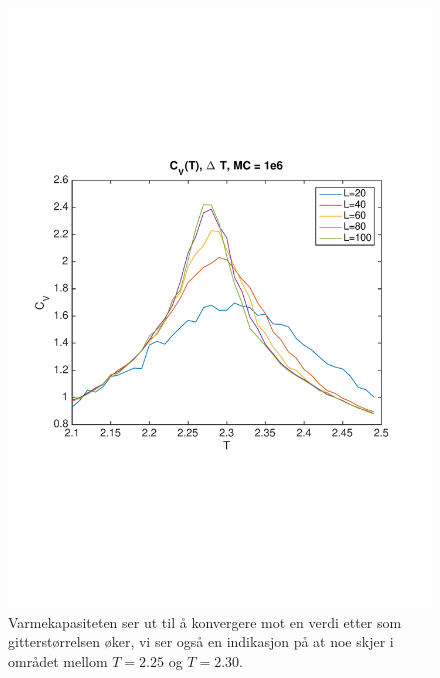 \documentclass[norsk, 10pt]{article}
\begin{document}
\begin{figure}[H]
	\centering
	\includegraphics[scale = 0.6, trim = 1cm 8cm 1cm 8cm]{cv_difftemp.pdf}
	\caption{Varmekapasiteten ser ut til å konvergere mot en verdi etter som gitterstørrelsen øker, vi ser også en indikasjon på at noe skjer i området mellom $T=2.25$ og $T = 2.30$.}
	\label{fig:cv_difftemp}
\end{figure}
\end{document}
